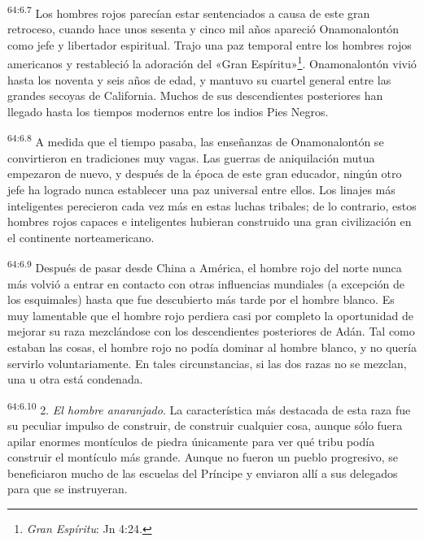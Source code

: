 \par
\textsuperscript{64:6.7} Los hombres rojos parecían estar sentenciados a causa de este gran retroceso, cuando hace unos sesenta y cinco mil años apareció Onamonalontón como jefe y libertador espiritual. Trajo una paz temporal entre los hombres rojos americanos y restableció la adoración del «Gran Espíritu»\footnote{\textit{Gran Espíritu}: Jn 4:24.}. Onamonalontón vivió hasta los noventa y seis años de edad, y mantuvo su cuartel general entre las grandes secoyas de California. Muchos de sus descendientes posteriores han llegado hasta los tiempos modernos entre los indios Pies Negros.

\par
\textsuperscript{64:6.8} A medida que el tiempo pasaba, las enseñanzas de Onamonalontón se convirtieron en tradiciones muy vagas. Las guerras de aniquilación mutua empezaron de nuevo, y después de la época de este gran educador, ningún otro jefe ha logrado nunca establecer una paz universal entre ellos. Los linajes más inteligentes perecieron cada vez más en estas luchas tribales; de lo contrario, estos hombres rojos capaces e inteligentes hubieran construido una gran civilización en el continente norteamericano.

\par
\textsuperscript{64:6.9} Después de pasar desde China a América, el hombre rojo del norte nunca más volvió a entrar en contacto con otras influencias mundiales (a excepción de los esquimales) hasta que fue descubierto más tarde por el hombre blanco. Es muy lamentable que el hombre rojo perdiera casi por completo la oportunidad de mejorar su raza mezclándose con los descendientes posteriores de Adán. Tal como estaban las cosas, el hombre rojo no podía dominar al hombre blanco, y no quería servirlo voluntariamente. En tales circunstancias, si las dos razas no se mezclan, una u otra está condenada.

\par
\textsuperscript{64:6.10} 2. \textit{El hombre anaranjado}. La característica más destacada de esta raza fue su peculiar impulso de construir, de construir cualquier cosa, aunque sólo fuera apilar enormes montículos de piedra únicamente para ver qué tribu podía construir el montículo más grande. Aunque no fueron un pueblo progresivo, se beneficiaron mucho de las escuelas del Príncipe y enviaron allí a sus delegados para que se instruyeran.

